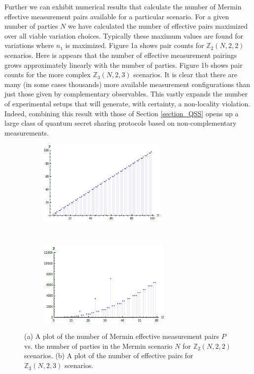 Further we can exhibit numerical results that calculate the number of Mermin effective measurement pairs available for a particular scenario. For a given number of parties $N$ we have calculated the number of effective pairs maximized over all viable variation choices.  Typically these maximum values are found for variations where $n_1$ is maximized. Figure 1a shows pair counts for $\mathbb{Z}_2(N,2,2)$ scenarios. Here is appears that the number of effective measurement pairings grows approximately linearly with the number of parties. Figure 1b shows pair counts for the more complex $\mathbb{Z}_3(N,2,3)$ scenarios. It is clear that there are many (in some cases thousands) more available measurement configurations than just those given by complementary observables. This vastly expands the number of experimental setups that will generate, with certainty, a non-locality violation.  Indeed, combining this result with those of Section \ref{section_QSS} opens up a large class of quantum secret sharing protocols based on non-complementary measurements.

\begin{figure}[th]
    \label{counts}
    \centering
    \begin{subfigure}[t]{0.5\textwidth}
        \centering
        \includegraphics[height=1.6in]{images/countsA_2D}
        \caption{ }
    \end{subfigure}%
    ~ 
    \begin{subfigure}[t]{0.5\textwidth}
        \centering
        \includegraphics[height=1.6in]{images/counts_2D}
        \caption{ }
    \end{subfigure}
    \caption[Numerical counts of Mermin effective pairs.]{(a) A plot of the number of Mermin effective measurement pairs $P$ vs. the number of parties in the Mermin scenario $N$ for $\mathbb{Z}_2(N,2,2)$ scenarios. (b) A plot of the number of effective pairs for $\mathbb{Z}_3(N,2,3)$ scenarios.}
\end{figure}


